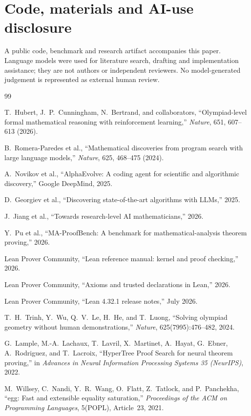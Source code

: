 \documentclass[11pt]{article}
\begin{document}
\section*{Code, materials and AI-use disclosure}
A public code, benchmark and research artifact accompanies this paper. Language models were used for literature search, drafting and implementation assistance; they are not authors or independent reviewers. No model-generated judgement is represented as external human review.

\begin{thebibliography}{99}

T.~Hubert, J.~P.~Cunningham, N.~Bertrand, and collaborators,
``Olympiad-level formal mathematical reasoning with reinforcement learning,''
\emph{Nature}, 651, 607--613 (2026).

B.~Romera-Paredes et al.,
``Mathematical discoveries from program search with large language models,''
\emph{Nature}, 625, 468--475 (2024).

A.~Novikov et al.,
``AlphaEvolve: A coding agent for scientific and algorithmic discovery,''
Google DeepMind, 2025.

D.~Georgiev et al.,
``Discovering state-of-the-art algorithms with LLMs,''
2025.

J.~Jiang et al.,
``Towards research-level AI mathematicians,''
2026.

Y.~Pu et al.,
``MA-ProofBench: A benchmark for mathematical-analysis theorem proving,''
2026.

Lean Prover Community,
``Lean reference manual: kernel and proof checking,''
2026.

Lean Prover Community,
``Axioms and trusted declarations in Lean,''
2026.

Lean Prover Community,
``Lean 4.32.1 release notes,'' July 2026.

T.~H.~Trinh, Y.~Wu, Q.~V.~Le, H.~He, and T.~Luong,
``Solving olympiad geometry without human demonstrations,''
\emph{Nature}, 625(7995):476--482, 2024.

G.~Lample, M.-A.~Lachaux, T.~Lavril, X.~Martinet, A.~Hayat, G.~Ebner,
A.~Rodriguez, and T.~Lacroix,
``HyperTree Proof Search for neural theorem proving,''
in \emph{Advances in Neural Information Processing Systems 35 (NeurIPS)}, 2022.

M.~Willsey, C.~Nandi, Y.~R.~Wang, O.~Flatt, Z.~Tatlock, and P.~Panchekha,
``egg: Fast and extensible equality saturation,''
\emph{Proceedings of the ACM on Programming Languages}, 5(POPL), Article~23,
2021.

\end{thebibliography}
\end{document}
